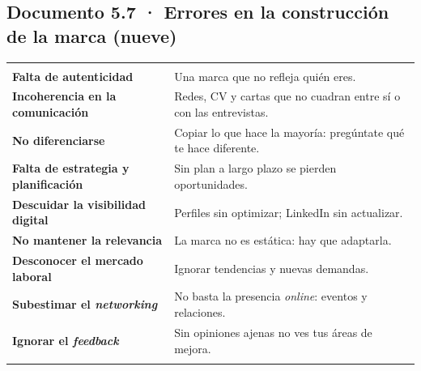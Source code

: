 
\subsection*{Documento 5.7 · Errores en la construcción de la marca (nueve)}
\begin{tabla}
\begin{tabularx}{\textwidth}{@{}>{\bfseries}p{4.2cm} Y@{}}
 &  \\
\midrule
Falta de autenticidad & Una marca que no refleja quién eres. \\
Incoherencia en la comunicación & Redes, CV y cartas que no cuadran entre sí o con las entrevistas. \\
No diferenciarse & Copiar lo que hace la mayoría: pregúntate qué te hace diferente. \\
Falta de estrategia y planificación & Sin plan a largo plazo se pierden oportunidades. \\
Descuidar la visibilidad digital & Perfiles sin optimizar; LinkedIn sin actualizar. \\
No mantener la relevancia & La marca no es estática: hay que adaptarla. \\
Desconocer el mercado laboral & Ignorar tendencias y nuevas demandas. \\
Subestimar el \emph{networking} & No basta la presencia \emph{online}: eventos y relaciones. \\
Ignorar el \emph{feedback} & Sin opiniones ajenas no ves tus áreas de mejora. \\
\bottomrule
\end{tabularx}
\end{tabla}

